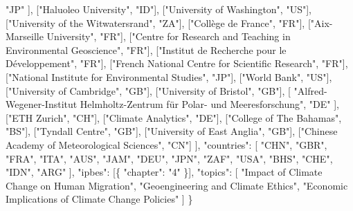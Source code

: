 \documentclass[
]{article}
\newenvironment{Shaded}{}{}
\newcommand{\DataTypeTok}[1]{\textcolor[rgb]{0.56,0.13,0.00}{#1}}
\newcommand{\FunctionTok}[1]{\textcolor[rgb]{0.02,0.16,0.49}{#1}}
\newcommand{\OtherTok}[1]{\textcolor[rgb]{0.00,0.44,0.13}{#1}}
\newcommand{\StringTok}[1]{\textcolor[rgb]{0.25,0.44,0.63}{#1}}
\begin{document}
\begin{Shaded}
\begin{Highlighting}[]
      \StringTok{"JP"}
    \OtherTok{],}
    \OtherTok{[}\StringTok{"Haluoleo University"}\OtherTok{,} \StringTok{"ID"}\OtherTok{],}
    \OtherTok{[}\StringTok{"University of Washington"}\OtherTok{,} \StringTok{"US"}\OtherTok{],}
    \OtherTok{[}\StringTok{"University of the Witwatersrand"}\OtherTok{,} \StringTok{"ZA"}\OtherTok{],}
    \OtherTok{[}\StringTok{"Collège de France"}\OtherTok{,} \StringTok{"FR"}\OtherTok{],}
    \OtherTok{[}\StringTok{"Aix{-}Marseille University"}\OtherTok{,} \StringTok{"FR"}\OtherTok{],}
    \OtherTok{[}\StringTok{"Centre for Research and Teaching in Environmental Geoscience"}\OtherTok{,} \StringTok{"FR"}\OtherTok{],}
    \OtherTok{[}\StringTok{"Institut de Recherche pour le Développement"}\OtherTok{,} \StringTok{"FR"}\OtherTok{],}
    \OtherTok{[}\StringTok{"French National Centre for Scientific Research"}\OtherTok{,} \StringTok{"FR"}\OtherTok{],}
    \OtherTok{[}\StringTok{"National Institute for Environmental Studies"}\OtherTok{,} \StringTok{"JP"}\OtherTok{],}
    \OtherTok{[}\StringTok{"World Bank"}\OtherTok{,} \StringTok{"US"}\OtherTok{],}
    \OtherTok{[}\StringTok{"University of Cambridge"}\OtherTok{,} \StringTok{"GB"}\OtherTok{],}
    \OtherTok{[}\StringTok{"University of Bristol"}\OtherTok{,} \StringTok{"GB"}\OtherTok{],}
    \OtherTok{[}
      \StringTok{"Alfred{-}Wegener{-}Institut Helmholtz{-}Zentrum für Polar{-} und Meeresforschung"}\OtherTok{,}
      \StringTok{"DE"}
    \OtherTok{],}
    \OtherTok{[}\StringTok{"ETH Zurich"}\OtherTok{,} \StringTok{"CH"}\OtherTok{],}
    \OtherTok{[}\StringTok{"Climate Analytics"}\OtherTok{,} \StringTok{"DE"}\OtherTok{],}
    \OtherTok{[}\StringTok{"College of The Bahamas"}\OtherTok{,} \StringTok{"BS"}\OtherTok{],}
    \OtherTok{[}\StringTok{"Tyndall Centre"}\OtherTok{,} \StringTok{"GB"}\OtherTok{],}
    \OtherTok{[}\StringTok{"University of East Anglia"}\OtherTok{,} \StringTok{"GB"}\OtherTok{],}
    \OtherTok{[}\StringTok{"Chinese Academy of Meteorological Sciences"}\OtherTok{,} \StringTok{"CN"}\OtherTok{]}
  \OtherTok{]}\FunctionTok{,}
  \DataTypeTok{"countries"}\FunctionTok{:} \OtherTok{[}
    \StringTok{"CHN"}\OtherTok{,}
    \StringTok{"GBR"}\OtherTok{,}
    \StringTok{"FRA"}\OtherTok{,}
    \StringTok{"ITA"}\OtherTok{,}
    \StringTok{"AUS"}\OtherTok{,}
    \StringTok{"JAM"}\OtherTok{,}
    \StringTok{"DEU"}\OtherTok{,}
    \StringTok{"JPN"}\OtherTok{,}
    \StringTok{"ZAF"}\OtherTok{,}
    \StringTok{"USA"}\OtherTok{,}
    \StringTok{"BHS"}\OtherTok{,}
    \StringTok{"CHE"}\OtherTok{,}
    \StringTok{"IDN"}\OtherTok{,}
    \StringTok{"ARG"}
  \OtherTok{]}\FunctionTok{,}
  \DataTypeTok{"ipbes"}\FunctionTok{:} \OtherTok{[}\FunctionTok{\{} \DataTypeTok{"chapter"}\FunctionTok{:} \StringTok{"4"} \FunctionTok{\}}\OtherTok{]}\FunctionTok{,}
  \DataTypeTok{"topics"}\FunctionTok{:} \OtherTok{[}
    \StringTok{"Impact of Climate Change on Human Migration"}\OtherTok{,}
    \StringTok{"Geoengineering and Climate Ethics"}\OtherTok{,}
    \StringTok{"Economic Implications of Climate Change Policies"}
  \OtherTok{]}
\FunctionTok{\}}
\end{Highlighting}
\end{Shaded}
\end{document}
